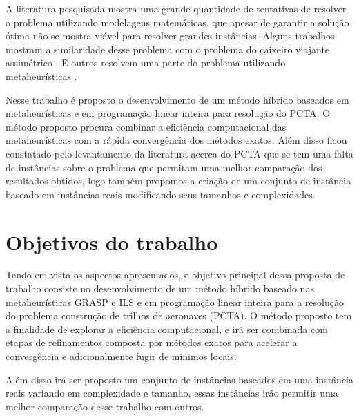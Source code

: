 	A literatura pesquisada mostra uma grande quantidade de tentativas de resolver o problema utilizando modelagens matemáticas, que apesar de garantir a solução ótima não se mostra viável para resolver grandes instâncias. Alguns trabalhos mostram a similaridade desse problema com o problema do caixeiro viajante assimétrico \cite{clarke97}. E outros resolvem uma parte do problema utilizando metaheurísticas \cite{arguelo1007}.

	Nesse trabalho é proposto o desenvolvimento de um método híbrido baseados em metaheurísticas e em programação linear inteira para resolução do PCTA. O método proposto procura combinar a eficiência computacional das metaheurísticas com a rápida convergência dos métodos exatos. Além disso ficou constatado pelo levantamento da literatura acerca do PCTA que se tem uma falta de instâncias sobre o problema que permitam uma melhor comparação dos resultados obtidos, logo também propomos a criação de um conjunto de instância baseado em instâncias reais modificando seus tamanhos e complexidades. 


\section {Objetivos do trabalho}

Tendo em vista os aspectos apresentados, o objetivo principal dessa proposta de trabalho consiste no desenvolvimento de um método híbrido baseado nas metaheurísticas GRASP e ILS e em programação linear inteira para a resolução do problema construção de trilhos de aeronaves (PCTA). O método proposto tem a finalidade de explorar a eficiência computacional, e irá ser combinada com etapas de refinamentos composta por métodos exatos para acelerar a convergência e adicionalmente fugir de mínimos locais.

Além disso irá ser proposto um conjunto de instâncias baseados em uma instância reais variando em complexidade e tamanho, essas instâncias irão permitir uma melhor comparação desse trabalho com outros.

